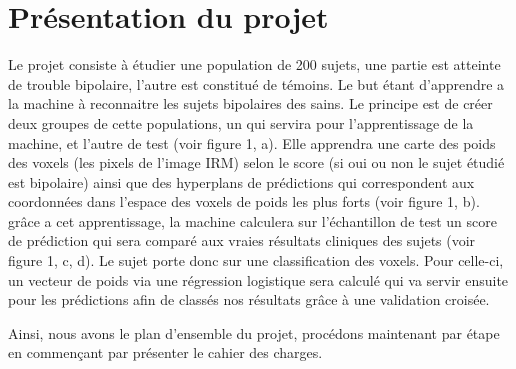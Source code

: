 \section{Présentation du projet}


Le projet consiste à étudier une population de 200 sujets, une partie est atteinte de trouble bipolaire, l'autre est constitué de témoins. Le but étant d'apprendre a la machine à reconnaitre les sujets bipolaires des sains. 
Le principe est de créer deux groupes de cette populations, un qui servira pour l'apprentissage de la machine, et l'autre de test (voir figure 1, a).
Elle apprendra une carte des poids des voxels (les pixels de l'image IRM) selon le score (si oui ou non le sujet étudié est bipolaire) ainsi que des hyperplans de prédictions qui correspondent aux coordonnées dans l'espace des voxels de poids les plus forts (voir figure 1, b).
grâce a cet apprentissage, la machine calculera sur l'échantillon de test un score de prédiction qui sera comparé aux vraies résultats cliniques des sujets (voir figure 1, c, d).
Le sujet porte donc sur une classification des voxels. Pour celle-ci, un vecteur de poids via une régression logistique sera calculé qui va servir ensuite pour les prédictions afin de classés nos résultats grâce à une validation croisée.

Ainsi, nous avons le plan d'ensemble du projet, procédons maintenant par étape en commençant par présenter le cahier des charges.

 

 